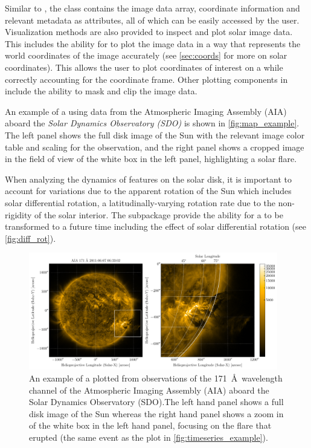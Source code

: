 Similar to \Timeseries, the \Map class contains the image data array, coordinate information and relevant metadata as attributes, all of which can be easily accessed by the user.
Visualization methods are also provided to inspect and plot solar image data.
This includes the ability for \Map to plot the image data in a way that represents the world coordinates of the image accurately (see \autoref{sec:coords} for more on solar coordinates).
This allows the user to plot coordinates of interest on a \Map while correctly accounting for the coordinate frame.
Other plotting components in \Map include the ability to mask and clip the image data.

An example of a \Map using data from the Atmospheric Imaging Assembly (AIA) aboard the \textit{Solar Dynamics Observatory (SDO)} is shown in \autoref{fig:map_example}.
The left panel shows the full disk image of the Sun with the relevant image color table and scaling for the observation, and the right panel shows a cropped image in the field of view of the white box in the left panel, highlighting a solar flare.

When analyzing the dynamics of features on the solar disk, it is important to account for variations due to the apparent rotation of the Sun which includes solar differential rotation, a latitudinally-varying rotation rate due to the non-rigidity of the solar interior\citep[see][]{Beck2000}.
The  subpackage provide the ability for a \Map to be transformed to a future time including the effect of solar differential rotation (see \autoref{fig:diff_rot}).

\begin{figure}
    \centering
    \includegraphics[width=0.97\textwidth]{figures/map_example.pdf}
    \caption{An example of a \sunpypkg \Map plotted from observations of the 171~\AA\ wavelength channel of the Atmospheric Imaging Assembly (AIA) aboard the Solar Dynamics Observatory (SDO).The left hand panel shows a full disk image of the Sun whereas the right hand panel shows a zoom in of the white box in the left hand panel, focusing on the flare that erupted (the same event as the \Timeseries plot in \autoref{fig:timeseries_example}).}
    \label{fig:map_example}
\end{figure}

